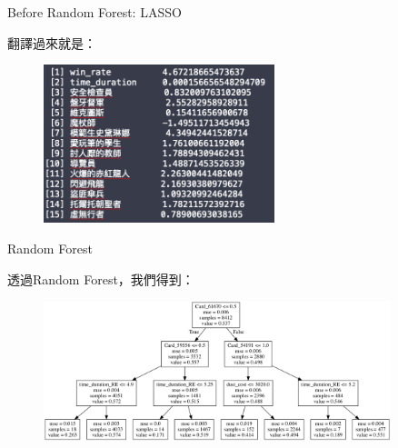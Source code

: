 \documentclass[12pt]{beamer}
\begin{document}
\begin{frame}[fragile]{Before Random Forest: LASSO}

翻譯過來就是：

	\begin{figure}
		\begin{center}
			\includegraphics[width=0.6\textwidth]{figure/f10.png}
		\end{center}
	\end{figure}

\end{frame}


\begin{frame}[fragile]{Random Forest}

透過Random Forest，我們得到：
	\begin{figure}
		\begin{center}
			\includegraphics[width=0.9\textwidth]{figure/plot/1a.png}
		\end{center}
	\end{figure}

\end{frame}
\end{document}
